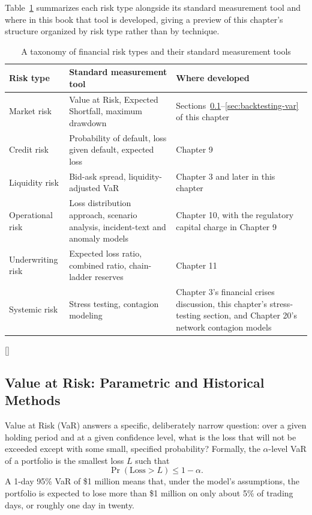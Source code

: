 \documentclass[../ai_in_finance]{subfiles}
\begin{document}
Table~\ref{tab:risk_taxonomy} summarizes each risk type alongside its standard measurement tool and where in this book that tool is developed, giving a preview of this chapter's structure organized by risk type rather than by technique.

\begin{table}[htbp]
\centering
\begin{lrbox}{\bookmeasuredbox}
\begin{tabular}{p{2.8cm}p{4.6cm}p{6.2cm}}
\toprule
Risk type & Standard measurement tool & Where developed \\
\midrule
Market risk & Value at Risk, Expected Shortfall, maximum drawdown & Sections~\ref{sec:var}--\ref{sec:backtesting-var} of this chapter \\
Credit risk & Probability of default, loss given default, expected loss & Chapter 9 \\
Liquidity risk & Bid-ask spread, liquidity-adjusted VaR & Chapter 3 and later in this chapter \\
Operational risk & Loss distribution approach, scenario analysis, incident-text and anomaly models & Chapter 10, with the regulatory capital charge in Chapter 9 \\
Underwriting risk & Expected loss ratio, combined ratio, chain-ladder reserves & Chapter 11 \\
Systemic risk & Stress testing, contagion modeling & Chapter 3's financial crises discussion, this chapter's stress-testing section, and Chapter 20's network contagion models \\
\bottomrule
\end{tabular}
\end{lrbox}
\ifdim\wd\bookmeasuredbox<0.65\linewidth
\setlength{\bookcapwidth}{0.65\linewidth}
\else
\setlength{\bookcapwidth}{\wd\bookmeasuredbox}
\fi
{}[\bookcapwidth]{
\usebox{\bookmeasuredbox}
}{
\caption{A taxonomy of financial risk types and their standard measurement tools}
\label{tab:risk_taxonomy}
}
\end{table}

\subsection{Value at Risk: Parametric and Historical Methods}
\label{sec:var}

Value at Risk (VaR) answers a specific, deliberately narrow question: over a given holding period and at a given confidence level, what is the loss that will not be exceeded except with some small, specified probability? Formally, the $\alpha$-level VaR of a portfolio is the smallest loss $L$ such that
$$\Pr(\text{Loss} > L) \le 1-\alpha.$$
A 1-day 95\% VaR of \$1 million means that, under the model's assumptions, the portfolio is expected to lose more than \$1 million on only about 5\% of trading days, or roughly one day in twenty.
\end{document}
